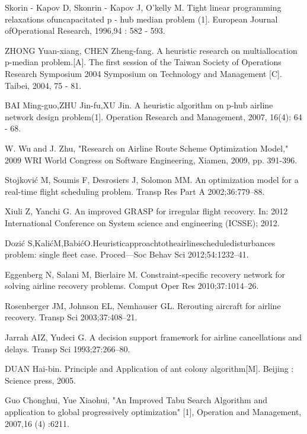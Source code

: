 \documentclass[runningheads]{llncs}
\begin{document}
\begin{thebibliography}{8}
Skorin - Kapov D, Skonrin - Kapov J, O'kelly M. Tight linear programming relaxations ofuncapacitated p - hub median problem (1]. European Journal ofOperational Research, 1996,94 : 582 - 593.

ZHONG Yuan-xiang, CHEN Zheng-fang. A heuristic research on multiallocation p-median problem.[A]. The first session of the Taiwan Society of Operations Research Symposium 2004 Symposium on Technology and Management [C]. Taibei, 2004, 75 - 81.

BAI Ming-guo,ZHU Jin-fu,XU Jin. A heuristic algorithm on p-hub airline network design problem(1]. Operation Research and Management, 2007, 16(4): 64 - 68. 

W. Wu and J. Zhu, "Research on Airline Route Scheme Optimization Model," 2009 WRI World Congress on Software Engineering, Xiamen, 2009, pp. 391-396.

Stojković M, Soumis F, Desrosiers J, Solomon MM. An optimization model for a real-time ﬂight scheduling problem. Transp Res Part A 2002;36:779–88. 

Xiuli Z, Yanchi G. An improved GRASP for irregular ﬂight recovery. In: 2012 International Conference on System science and engineering (ICSSE); 2012. 

Dozić S,KalićM,BabićO.Heuristicapproachtotheairlinescheduledisturbances problem: single ﬂeet case. Proced—Soc Behav Sci 2012;54:1232–41. 

Eggenberg N, Salani M, Bierlaire M. Constraint-speciﬁc recovery network for solving airline recovery problems. Comput Oper Res 2010;37:1014–26. 

Rosenberger JM, Johnson EL, Nemhauser GL. Rerouting aircraft for airline recovery. Transp Sci 2003;37:408–21.

Jarrah AIZ, Yudeci G. A decision support framework for airline cancellations and delays. Transp Sci 1993;27:266–80. 

DUAN Hai-bin. Principle and Application of ant colony algorithm[M]. Beijing : Science press, 2005.

Guo Chonghui, Yue Xiaohui, "An Improved Tabu Search Algorithm and application to global progressively optimization" [1], Operation and Management, 2007,16 (4) :6211.



\end{thebibliography}
\end{document}
